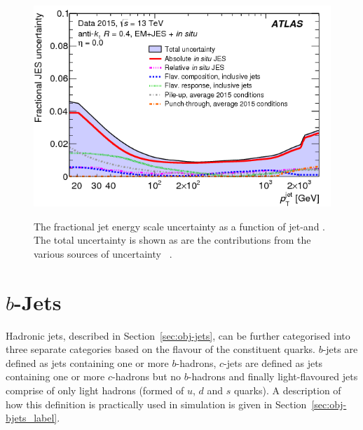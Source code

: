 \begin{figure}[!ht]
  \begin{center}
    \captionsetup[subfigure]{aboveskip=0pt,justification=centering}
     {\includegraphics[width=0.45\linewidth, angle=0]{figs/Objects/jets_uncert_JES_pt.png} }
  \end{center}
  \caption[The fractional jet energy scale uncertainty as a function of jet-\pT and \eta.
    The total uncertainty is shown as are the contributions from the various sources of uncertainty.]
          {The fractional jet energy scale uncertainty as a function of jet-\pT and \eta.
            The total uncertainty is shown as are the contributions from the various sources of uncertainty ~\cite{obj-jets_calib_run2}.}
  \label{fig:obj-jets_calib_JES}
\end{figure}

\FloatBarrier

\newpage
\section{$b$-Jets}
\label{sec:obj-bjets}

Hadronic jets, described in Section~\ref{sec:obj-jets}, can be further categorised into three separate categories based on the flavour of the constituent quarks.
$b$-jets are defined as jets containing one or more $b$-hadrons,
$c$-jets are defined as jets containing one or more $c$-hadrons but no $b$-hadrons
and finally light-flavoured jets comprise of only light hadrons (formed of $u$, $d$ and $s$ quarks).
A description of how this definition is practically used in simulation is given in Section~\ref{sec:obj-bjets_label}.

